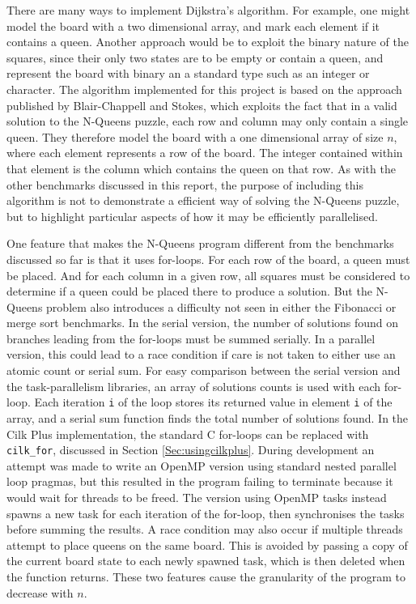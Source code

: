 \documentclass{report}
\begin{document}
There are many ways to implement Dijkstra's algorithm. For example, one might model the board with a two dimensional array, and mark each element if it contains a queen. Another approach would be to exploit the binary nature of the squares, since their only two states are to be empty or contain a queen, and represent the board with binary an a standard type such as an integer or character. The algorithm implemented for this project is based on the approach published by Blair-Chappell and Stokes\cite{Blair12}, which exploits the fact that in a valid solution to the N-Queens puzzle, each row and column may only contain a single queen. They therefore model the board with a one dimensional array of size \(n\), where each element represents a row of the board. The integer contained within that element is the column which contains the queen on that row. As with the other benchmarks discussed in this report, the purpose of including this algorithm is not to demonstrate a efficient way of solving the N-Queens puzzle, but to highlight particular aspects of how it may be efficiently parallelised.

One feature that makes the N-Queens program different from the benchmarks discussed so far is that it uses for-loops. For each row of the board, a queen must be placed. And for each column in a given row, all squares must be considered to determine if a queen could be placed there to produce a solution. But the N-Queens problem also introduces a difficulty not seen in either the Fibonacci or merge sort benchmarks. In the serial version, the number of solutions found on branches leading from the for-loops must be summed serially. In a parallel version, this could lead to a race condition if care is not taken to either use an atomic count or serial sum. For easy comparison between the serial version and the task-parallelism libraries, an array of solutions counts is used with each for-loop. Each iteration \verb!i! of the loop stores its returned value in element \verb!i! of the array, and a serial sum function finds the total number of solutions found. In the Cilk Plus implementation, the standard C for-loops can be replaced with \verb!cilk_for!, discussed in Section \ref{Sec:usingcilkplus}. During development an attempt was made to write an OpenMP version using standard nested parallel loop pragmas, but this resulted in the program failing to terminate because it would wait for threads to be freed. The version using OpenMP tasks instead spawns a new task for each iteration of the for-loop, then synchronises the tasks before summing the results. A race condition may also occur if multiple threads attempt to place queens on the same board. This is avoided by passing a copy of the current board state to each newly spawned task, which is then deleted when the function returns. These two features cause the granularity of the program to decrease with \(n\).
\end{document}
